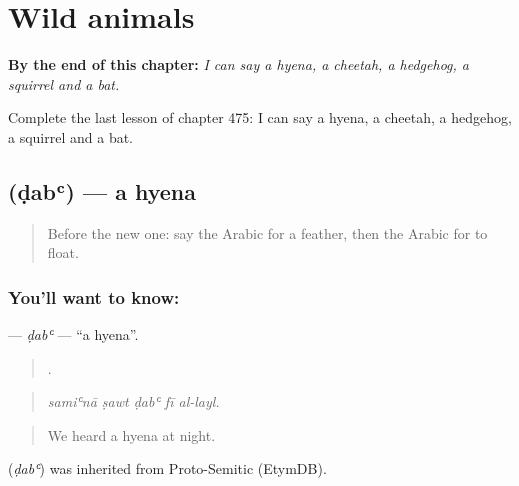 
\chapter{Wild animals}
\label{ch:ar-wild-animals}

\begin{chapteropening}
\textbf{By the end of this chapter:} \emph{I can say a hyena, a cheetah, a hedgehog, a squirrel and a bat.}

Complete the last lesson of chapter 475: I can say a hyena, a cheetah, a hedgehog, a squirrel and a bat.
\end{chapteropening}

\section[\texorpdfstring{\ar{ضبع} (ḍabʿ)}{ضبع (ḍabʿ)}]{ (ḍabʿ) — a hyena}

\label{lesson:AR-C475-dabu}



\begin{quote}
Before the new one: say the Arabic for a feather, then the Arabic for to float.
\end{quote}

\subsection*{You'll want to know: }
\textbf{} — \emph{ḍabʿ} — \textquotedblleft{}a hyena\textquotedblright{}.

\begin{quote}
    .
\end{quote}

\begin{quote}
\emph{samiʿnā ṣawt ḍabʿ fī al-layl.}
\end{quote}

\begin{quote}
We heard a hyena at night.
\end{quote}

\begin{cousinweb}
\textbf{} (\emph{ḍabʿ}) was inherited from Proto-Semitic (EtymDB).
\end{cousinweb}

